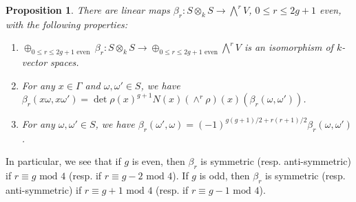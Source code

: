 \documentclass{article} %
\newtheorem{proposition}{Proposition}[section]
\numberwithin{equation}{section}
\begin{document}
\begin{proposition}\label{prop_decomposing_S_tensor_S}
    There are linear maps $\beta_r : S \otimes_k S \to \bigwedge^r V$, $0 \leq r \leq 2g+1$ even, with the following properties:
        \begin{enumerate}
            \item $\oplus_{0 \leq r \leq 2g+1 \text{ even }} \beta_r : S \otimes_k S \to \oplus_{0 \leq r \leq 2g+1 \text{ even}} \bigwedge^r V$ is an isomorphism of $k$-vector spaces.
            \item For any $x \in \Gamma$ and $\omega, \omega' \in S$, we have $\beta_r(x \omega, x \omega') = \det \rho(x)^{g+1} N(x) (\wedge^r \rho)(x)(\beta_r(\omega, \omega'))$.
            \item For any $\omega, \omega' \in S$, we have $\beta_r(\omega', \omega) = (-1)^{g(g+1)/2+r(r+1)/2} \beta_r(\omega, \omega')$. 
        \end{enumerate}
\end{proposition}
In particular, we see that if $g$ is even, then  $\beta_r$ is symmetric (resp. anti-symmetric) if $r \equiv g \text{ mod }4$ (resp. if $r \equiv g-2 \text{ mod }4$). If $g$ is odd, then $\beta_r$ is symmetric (resp. anti-symmetric) if $r \equiv g+1 \text{ mod }4$ (resp. if $r \equiv g-1 \text{ mod }4$).
\end{document}
